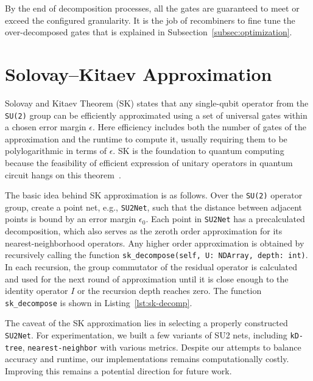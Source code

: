 \documentclass[a4paper,titlepage]{article}
\begin{document}
    By the end of decomposition processes, all the gates are guaranteed
    to meet or exceed the configured granularity.
    It is the job of recombiners to fine tune the over-decomposed gates that is explained in Subsection~\ref{subsec:optimization}.


    \section{Solovay--Kitaev Approximation}\label{sec:sk-approx}

    Solovay and Kitaev Theorem (SK) states that any single-qubit operator
    from the \texttt{SU(2)} group can be efficiently approximated using a set of universal gates
    within a chosen error margin $\epsilon$.
    Here efficiency includes both the number of gates of the approximation
    and the runtime to compute it, usually requiring them to be polylogarithmic in terms of $\epsilon$.
    SK is the foundation to quantum computing because the feasibility of efficient expression of
    unitary operators in quantum circuit hangs on this theorem~\cite{kitaev1997quantum,dawson2005sk}.


    The basic idea behind SK approximation is as follows.
    Over the \texttt{SU(2)} operator group, create a point net, e.g., \texttt{SU2Net},
    such that the distance between adjacent points is bound by an error margin $\epsilon_{0}$.
    Each point in \texttt{SU2Net} has a precalculated decomposition,
    which also serves as the zeroth order approximation for its nearest-neighborhood operators.
    Any higher order approximation is obtained by recursively
    calling the function \texttt{sk_decompose(self, U: NDArray, depth: int)}.
    In each recursion, the group commutator of the residual operator is calculated and used for the next round of approximation
    until it is close enough to the identity operator $I$ or the recursion depth reaches zero.
    The function \texttt{sk\_decompose} is shown in Listing~\ref{lst:sk-decomp}.



    The caveat of the SK approximation lies in selecting a properly constructed \texttt{SU2Net}.
    For experimentation, we built a few variants of SU2 nets,
    including \texttt{kD-tree}, \texttt{nearest-neighbor} with various metrics.
    Despite our attempts to balance accuracy and runtime, our implementations remains computationally costly.
    Improving this remains a potential direction for future work.
\end{document}
